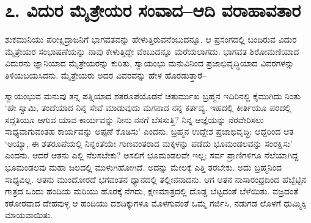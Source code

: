 
\chapter{೭. ವಿದುರ ಮೈತ್ರೇಯರ ಸಂವಾದ–ಆದಿ ವರಾಹಾವತಾರ}

ಶುಕಮುನಿಯು ಪರೀಕ್ಷಿದ್ರಾಜನಿಗೆ ಭಾಗವತವನ್ನು ಹೇಳುತ್ತಿರುವನೆಂಬುದನ್ನೂ, ಆ ಪ್ರಸಂಗದಲ್ಲಿ ಬಂದಿರುವ ವಿದುರ ಮೈತ್ರೇಯರ ಸಂಭಾಷಣೆಯನ್ನು ನಾವು ಕೇಳುತ್ತಿದ್ದೇ ವೆಂಬುದನ್ನೂ ಮರೆಯಲಾಗದು. ಭಾಗವತ ಶಿರೋಮಣಿಯಾದ ವಿದುರನು ಜ್ಞಾನಿಯಾದ ಮೈತ್ರೇಯರನ್ನು ಕುರಿತು, ಸ್ವಾಯಂಭು ಮನುವಿನಿಂದ ಪ್ರಜಾಭಿವೃದ್ಧಿಯಾದ ವಿವರಗಳನ್ನು ತಿಳಿಯಬಯಸಿದನು. ಮೈತ್ರೇಯರು ಅದರ ವಿವರವನ್ನು ಹೇಳ ಹೊರಡುತ್ತಾರೆ–

ಸ್ವಾಯಂಭುವ ಮನುವು ತನ್ನ ಪತ್ನಿಯಾದ ಶತರೂಪೆಯೊಡನೆ ಚತುರ್ಮುಖ ಬ್ರಹ್ಮನ ಇದಿರಿನಲ್ಲಿ ಕೈಮುಗಿದು ನಿಂತು ‘ಹೇ ಸ್ವಾಮಿ, ತಂದೆಯಾದ ನಿನ್ನ ಸೇವೆ ಮಾಡುವುದು ಮಗನಾದ ನನ್ನ ಕರ್ತವ್ಯ. ಇಹದಲ್ಲಿ ಕೀರ್ತಿಯೂ ಪರದಲ್ಲಿ ಸದ್ಗತಿಯೂ ಆಗುವ ಯಾವ ಕಾರ್ಯವನ್ನು ನೀನು ನನಗೆ ಬೆಸಸುತ್ತಿ? ನಿನ್ನ ಆಜ್ಞೆಯನ್ನು ನೆರವೇರಿಸಲು ಸಾಧ್ಯವಾಗುವಂತಹ ಕಾರ್ಯವನ್ನು ಅಪ್ಪಣೆ ಕೊಡಿಸು’ ಎಂದನು. ಬ್ರಹ್ಮನ ಉದ್ದೇಶ ಪ್ರಜಾಭಿವೃದ್ಧಿ; ಆದ್ದರಿಂದ ಆತ ‘ಅಯ್ಯಾ, ಈ ಶತರೂಪೆಯಲ್ಲಿ ನಿನ್ನಂತೆಯೇ ಗುಣವಂತರಾದ ಮಕ್ಕಳನ್ನು ಪಡೆದು ಭೂಮಂಡಲವನ್ನು ಸಂರಕ್ಷಿಸು’ ಎಂದನು. ಆದರೆ ಆತನು ಎಲ್ಲಿ ನೆಲಸಬೇಕು? ಅಸಲಿಗೆ ಭೂಮಂಡಲವೇ ಇಲ್ಲ; ಸರ್ವ ಪ್ರಾಣಿಗಳಿಗೂ ನೆಲೆಯಾಗಿದ್ದ ಭೂಮಂಡಲವು ಮಹಾ ಜಲದಲ್ಲಿ ಮುಳುಗಿಹೋಗಿದೆ. ಅದನ್ನು ಮೇಲಕ್ಕೆ ಎತ್ತಿ ತರಬೇಕು. ಅದು ಬ್ರಹ್ಮನಿಂದ ಸಾಧ್ಯವಿಲ್ಲ. ಆತನು ಮುಂದೋರದೆ ಭಗವಂತನ ಧ್ಯಾನದಲ್ಲಿ ತಲ್ಲೀನನಾದನು. ಆಗ ಆತನ ನಾಸಾರಂಧ್ರದಿಂದ ಹೆಬ್ಬೆಟ್ಟಿನ ಗಾತ್ರದ ಒಂದು ಹಂದಿಯ ಮರಿಯು ಹೊರಕ್ಕೆ ನೆಗದು, ಕ್ಷಣಮಾತ್ರದಲ್ಲಿ ದೊಡ್ಡ ಬೆಟ್ಟದಂತೆ ಬೆಳೆಯಿತು. ವಜ್ರದಂತೆ ಕಠೋರವಾದ ದೇಹವುಳ್ಳ ಆ ಹಂದಿಯು ದಶದಿಕ್ಕುಗಳೂ ಮೊಳಗುವಂತೆ ಒಮ್ಮೆ ಗರ್ಜಿಸಿ, ನಡುಗಡ ಲೊಳಗೆ ಧುಮ್ಮಿಕ್ಕಿ ಮಾಯವಾಯಿತು.

